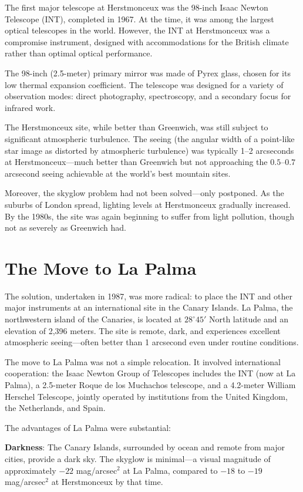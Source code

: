 The first major telescope at Herstmonceux was the 98-inch Isaac Newton Telescope (INT), completed in 1967. At the time, it was among the largest optical telescopes in the world. However, the INT at Herstmonceux was a compromise instrument, designed with accommodations for the British climate rather than optimal optical performance.

The 98-inch (2.5-meter) primary mirror was made of Pyrex glass, chosen for its low thermal expansion coefficient. The telescope was designed for a variety of observation modes: direct photography, spectroscopy, and a secondary focus for infrared work.

The Herstmonceux site, while better than Greenwich, was still subject to significant atmospheric turbulence. The seeing (the angular width of a point-like star image as distorted by atmospheric turbulence) was typically 1–2 arcseconds at Herstmonceux—much better than Greenwich but not approaching the $0.5–0.7$ arcsecond seeing achievable at the world's best mountain sites.

Moreover, the skyglow problem had not been solved—only postponed. As the suburbs of London spread, lighting levels at Herstmonceux gradually increased. By the 1980s, the site was again beginning to suffer from light pollution, though not as severely as Greenwich had.

\section{The Move to La Palma}

The solution, undertaken in 1987, was more radical: to place the INT and other major instruments at an international site in the Canary Islands. La Palma, the northwestern island of the Canaries, is located at $28^{\circ}45'$ North latitude and an elevation of 2,396 meters. The site is remote, dark, and experiences excellent atmospheric seeing—often better than 1 arcsecond even under routine conditions.

The move to La Palma was not a simple relocation. It involved international cooperation: the Isaac Newton Group of Telescopes includes the INT (now at La Palma), a 2.5-meter Roque de los Muchachos telescope, and a 4.2-meter William Herschel Telescope, jointly operated by institutions from the United Kingdom, the Netherlands, and Spain.

The advantages of La Palma were substantial:

\textbf{Darkness}: The Canary Islands, surrounded by ocean and remote from major cities, provide a dark sky. The skyglow is minimal—a visual magnitude of approximately $-22$ mag/arcsec$^2$ at La Palma, compared to $-18$ to $-19$ mag/arcsec$^2$ at Herstmonceux by that time.

